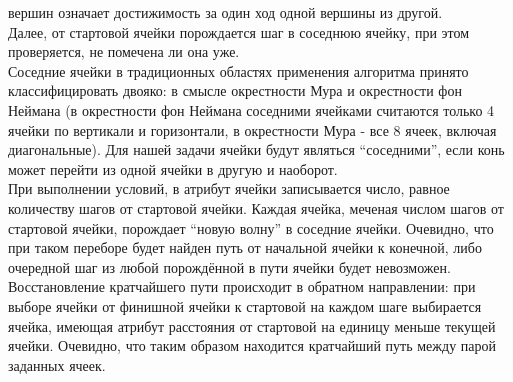 вершин означает достижимость за один ход одной вершины из другой.\\
Далее, от стартовой ячейки порождается шаг в соседнюю ячейку, при этом
проверяется, не помечена ли она уже.\\
Соседние ячейки в традиционных областях применения алгоритма принято
классифицировать двояко: в смысле окрестности Мура и
окрестности фон Неймана (в окрестности фон Неймана
соседними ячейками считаются только 4 ячейки по вертикали и горизонтали, в
окрестности Мура - все 8 ячеек, включая диагональные). Для нашей задачи ячейки
будут являться ``соседними'', если конь может перейти из одной ячейки в другую
и наоборот.\\
При выполнении условий, в атрибут ячейки записывается число, равное количеству шагов от
стартовой ячейки. Каждая
ячейка, меченая числом шагов от стартовой ячейки, порождает ``новую волну'' в 
соседние ячейки. Очевидно, что при таком переборе
будет найден путь от начальной ячейки к конечной, либо очередной шаг из любой
порождённой в пути ячейки будет невозможен.\\
Восстановление кратчайшего пути происходит в обратном направлении: при выборе
ячейки от финишной ячейки к стартовой на каждом шаге выбирается ячейка,
имеющая атрибут расстояния от стартовой на единицу меньше текущей ячейки.
Очевидно, что таким образом находится кратчайший путь между парой заданных
ячеек.
\pagebreak
